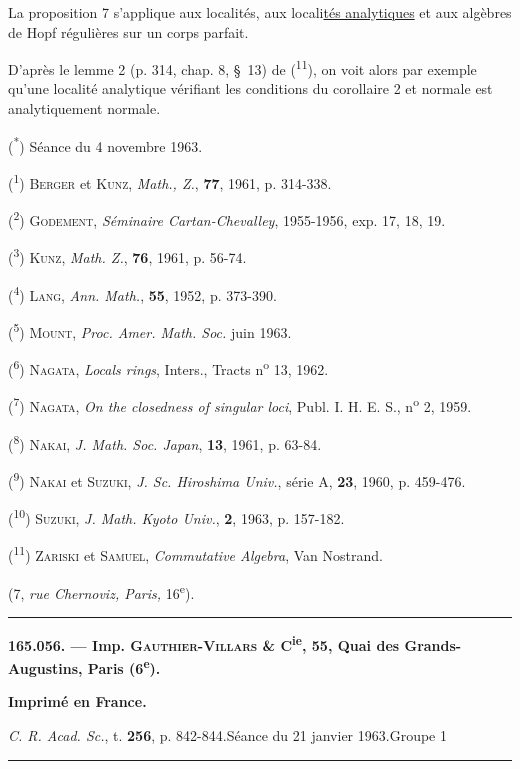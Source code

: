 La proposition 7 s’applique aux localités, aux locali\uline{tés analytiques} et aux algèbres de Hopf régulières sur un corps parfait.

D’après le lemme 2 (p. 314, chap. 8, \S~13) de (\textsuperscript{11}), on voit alors par exemple qu’une localité analytique vérifiant les conditions du corollaire 2 et normale est analytiquement normale.

(\textsuperscript{*}) Séance du 4 novembre 1963.

(\textsuperscript{1}) \textsc{Berger} et \textsc{Kunz}, \textit{Math., Z.}, \textbf{77}, 1961, p. 314-338.

(\textsuperscript{2}) \textsc{Godement}, \textit{Séminaire Cartan-Chevalley}, 1955-1956, exp. 17, 18, 19.

(\textsuperscript{3}) \textsc{Kunz}, \textit{Math. Z.}, \textbf{76}, 1961, p. 56-74.

(\textsuperscript{4}) \textsc{Lang}, \textit{Ann. Math.}, \textbf{55}, 1952, p. 373-390.

(\textsuperscript{5}) \textsc{Mount}, \textit{Proc. Amer. Math. Soc.} juin 1963.

(\textsuperscript{6}) \textsc{Nagata}, \textit{Locals rings}, Inters., Tracts n\textsuperscript{o} 13, 1962.

(\textsuperscript{7}) \textsc{Nagata}, \textit{On the closedness of singular loci}, Publ. I. H. E. S., n\textsuperscript{o} 2, 1959.

(\textsuperscript{8}) \textsc{Nakai}, \textit{J. Math. Soc. Japan}, \textbf{13}, 1961, p. 63-84.

(\textsuperscript{9}) \textsc{Nakai} et \textsc{Suzuki}, \textit{J. Sc. Hiroshima Univ.}, série A, \textbf{23}, 1960, p. 459-476.

(\textsuperscript{10}) \textsc{Suzuki}, \textit{J. Math. Kyoto Univ.}, \textbf{2}, 1963, p. 157-182.

(\textsuperscript{11}) \textsc{Zariski} et \textsc{Samuel}, \textit{Commutative Algebra}, Van Nostrand.

\hfill(7, \textit{rue Chernoviz, Paris,} 16\textsuperscript{e}).
\noindent\rule{\linewidth}{0.4pt}

\textbf{165.056. --- Imp. \textsc{Gauthier-Villars} \& C\textsuperscript{ie}, 55, Quai des Grands-Augustins, Paris (6\textsuperscript{e}).}

\centerline{\textbf{Imprimé en France.}}
\textit{C. R. Acad. Sc.}, t. \textbf{256}, p. 842-844.\hfill Séance du 21 janvier 1963.\hfill Groupe 1\par\noindent\rule{\linewidth}{0.4pt}

